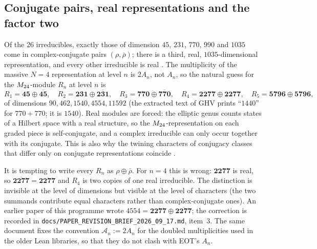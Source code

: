 \subsection{Conjugate pairs, real representations and the factor two}
\label{sec:moonshine:conjugate}

Of the $26$ irreducibles, exactly those of dimension $45$, $231$, $770$, $990$ and $1035$
come in complex-conjugate pairs $(\rho,\bar\rho)$; there is a third, real,
$1035$-dimensional representation, and every other irreducible is real
. The multiplicity of the massive $N=4$ representation at
level $n$ is $2A_n$, not $A_n$, so the natural guess for the $M_{24}$-module $R_n$ at level $n$
is
\begin{equation}\label{eq:moonshine:Rn}
  R_1=\mathbf{45}\oplus\overline{\mathbf{45}},\quad
  R_2=\mathbf{231}\oplus\overline{\mathbf{231}},\quad
  R_3=\mathbf{770}\oplus\overline{\mathbf{770}},\quad
  R_4=\mathbf{2277}\oplus\mathbf{2277},\quad
  R_5=\mathbf{5796}\oplus\mathbf{5796},
\end{equation}
of dimensions $90,462,1540,4554,11592$  (the extracted text
of GHV prints ``$1440$'' for $770+770$; it is $1540$). Real modules are
forced: the elliptic genus counts states of a Hilbert space with a real structure, so the
$M_{24}$-representation on each graded piece is self-conjugate, and a complex irreducible can
only occur together with its conjugate. This is also why the twining characters of conjugacy
classes that differ only on conjugate representations coincide
.

\begin{pitfallbox}[$4554=2\cdot2277$, not $2277\oplus\overline{2277}$]
It is tempting to write every $R_n$ as $\rho\oplus\bar\rho$. For $n=4$ this is wrong:
$\mathbf{2277}$ is real, so $\overline{\mathbf{2277}}=\mathbf{2277}$ and $R_4$ is two
copies of one real irreducible. The distinction is invisible at the level of dimensions but
visible at the level of characters (the two summands contribute equal characters rather than
complex-conjugate ones). An earlier paper of this programme wrote
$4554=\mathbf{2277}\oplus\overline{\mathbf{2277}}$; the correction is recorded in
\texttt{docs/PAPER\_REVISION\_BRIEF\_2026\_09\_17.md}, item~3. The same document fixes the
convention $\mathcal A_n:=2A_n$ for the doubled multiplicities used in the older Lean
libraries, so that they do not clash with EOT's $A_n$.
\end{pitfallbox}

